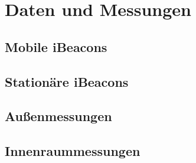 \chapter{Daten und Messungen}
\label{chap:dataandmeasure}

\section{Mobile iBeacons}
\label{sec:dataandmeasurement:mobilebeacon}

\section{Stationäre iBeacons}
\label{sec:dataandmeasurement:stationarybeacon}

\section{Außenmessungen}
\label{sec:dataandmeasurement:outdoormeasure}

\section{Innenraummessungen}
\label{sec:dataandmeasurement:indoormeasure}
